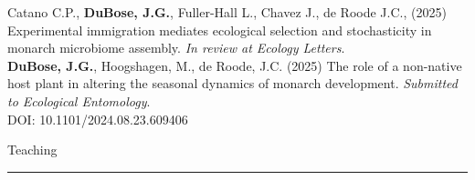\documentclass{article}
\begin{document}
\hangindent=0.7cm Catano C.P., \textbf{DuBose, J.G.}, Fuller-Hall L., Chavez J., de Roode J.C., (2025) Experimental immigration mediates ecological selection and stochasticity in monarch microbiome assembly. \emph{In review at Ecology Letters}. \\

\hangindent=0.7cm \textbf{DuBose, J.G.}, Hoogshagen, M., de Roode, J.C. (2025) The role of a non-native host plant in altering the seasonal dynamics of monarch development. \emph{Submitted to Ecological Entomology}. \\
DOI: 10.1101/2024.08.23.609406 \\

\pagebreak
\begin{flushleft}
{\Large Teaching} \rule{16.51cm}{0.4pt}\\
\end{flushleft}
\end{document}
